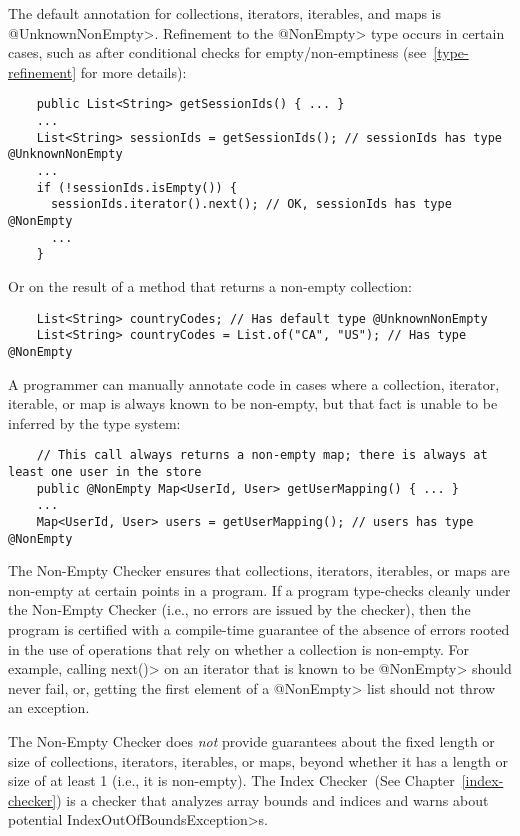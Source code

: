 The default annotation for collections, iterators, iterables, and maps is
\<@UnknownNonEmpty>.
Refinement to the \<@NonEmpty> type occurs in certain cases, such as after
conditional checks for empty/non-emptiness (see~\ref{type-refinement} for
more details):

\begin{Verbatim}
    public List<String> getSessionIds() { ... }
    ...
    List<String> sessionIds = getSessionIds(); // sessionIds has type @UnknownNonEmpty
    ...
    if (!sessionIds.isEmpty()) {
      sessionIds.iterator().next(); // OK, sessionIds has type @NonEmpty
      ...
    }
\end{Verbatim}

Or on the result of a method that returns a non-empty collection:

\begin{Verbatim}
    List<String> countryCodes; // Has default type @UnknownNonEmpty
    List<String> countryCodes = List.of("CA", "US"); // Has type @NonEmpty
\end{Verbatim}

A programmer can manually annotate code in cases where a collection,
iterator, iterable, or map is always known to be non-empty, but that fact is
unable to be inferred by the type system:

\begin{Verbatim}
    // This call always returns a non-empty map; there is always at least one user in the store
    public @NonEmpty Map<UserId, User> getUserMapping() { ... }
    ...
    Map<UserId, User> users = getUserMapping(); // users has type @NonEmpty
\end{Verbatim}


The Non-Empty Checker ensures that collections, iterators, iterables, or maps
are non-empty at certain points in a program.
If a program type-checks cleanly under the Non-Empty Checker (i.e., no errors
are issued by the checker), then the program is certified with a compile-time
guarantee of the absence of errors rooted in the use of operations that
rely on whether a collection is non-empty.
For example, calling \<next()> on an iterator that is known to be \<@NonEmpty>
should never fail, or, getting the first element of a \<@NonEmpty> list should
not throw an exception.

The Non-Empty Checker does \emph{not} provide guarantees about the fixed
length or size of collections, iterators, iterables, or maps, beyond whether
it has a length or size of at least 1 (i.e., it is non-empty).
The Index Checker~(See Chapter~\ref{index-checker}) is a checker that analyzes
array bounds and indices and warns about potential
\<IndexOutOfBoundsException>s.

